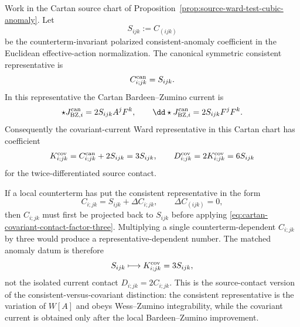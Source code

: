 \begin{proposition}
\label{prop:cartan-consistent-covariant-contact-handoff}
Work in the Cartan source chart of
Proposition~\ref{prop:source-ward-test-cubic-anomaly}.  Let
\[
  S_{ijk}:=C_{(ijk)}
\]
be the counterterm-invariant polarized consistent-anomaly coefficient in the
Euclidean effective-action normalization.  The canonical symmetric consistent
representative is
\[
  C_{i;jk}^{\rm can}=S_{ijk}.
\]
In this representative the Cartan Bardeen--Zumino current is
\begin{equation}
  \star J_{{\rm BZ},i}^{\rm can}
  =
  2S_{ijk}A^jF^k,
  \qquad
  \dd\star J_{{\rm BZ},i}^{\rm can}
  =
  2S_{ijk}F^jF^k .
  \label{eq:cartan-bz-current-class-map}
\end{equation}
Consequently the covariant-current Ward representative in this Cartan chart
has coefficient
\begin{equation}
  K_{i;jk}^{\rm cov}
  =
  C_{i;jk}^{\rm can}+2S_{ijk}
  =
  3S_{ijk},
  \qquad
  D_{i;jk}^{\rm cov}=2K_{i;jk}^{\rm cov}=6S_{ijk}
  \label{eq:cartan-covariant-contact-factor-three}
\end{equation}
for the twice-differentiated source contact.

If a local counterterm has put the consistent representative in the form
\[
  C_{i;jk}=S_{ijk}+\Delta C_{i;jk},
  \qquad
  \Delta C_{(ijk)}=0,
\]
then \(C_{i;jk}\) must first be projected back to \(S_{ijk}\) before applying
\eqref{eq:cartan-covariant-contact-factor-three}.  Multiplying a single
counterterm-dependent \(C_{i;jk}\) by three would produce a
representative-dependent number.  The matched anomaly datum is therefore
\[
  S_{ijk}
  \longmapsto
  K_{i;jk}^{\rm cov}=3S_{ijk},
\]
not the isolated current contact
\(D_{i;jk}=2C_{i;jk}\).  This is the source-contact version of the
consistent-versus-covariant distinction: the consistent representative is the
variation of \(W[A]\) and obeys Wess--Zumino integrability, while the covariant
current is obtained only after the local Bardeen--Zumino improvement.
\end{proposition}


